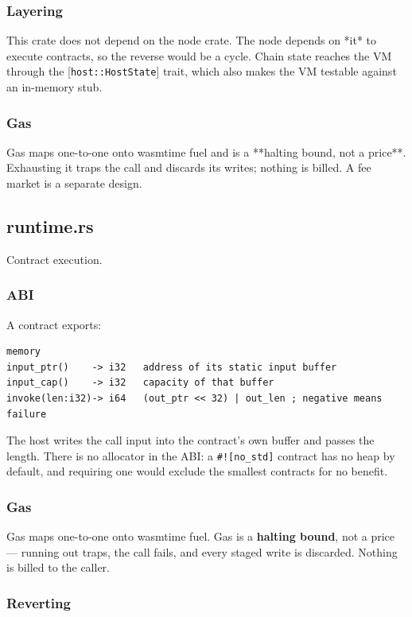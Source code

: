 \documentclass[11pt,a4paper]{article}
\begin{document}
\subsubsection{Layering}

This crate does not depend on the node crate. The node depends on *it* to
execute contracts, so the reverse would be a cycle. Chain state reaches the
VM through the [\texttt{host::HostState}] trait, which also makes the VM testable
against an in-memory stub.

\subsubsection{Gas}

Gas maps one-to-one onto wasmtime fuel and is a **halting bound, not a
price**. Exhausting it traps the call and discards its writes; nothing is
billed. A fee market is a separate design.

\subsection{runtime.rs}
Contract execution.

\subsubsection{ABI}

A contract exports:

\begin{verbatim}
memory
input_ptr()    -> i32   address of its static input buffer
input_cap()    -> i32   capacity of that buffer
invoke(len:i32)-> i64   (out_ptr << 32) | out_len ; negative means failure
\end{verbatim}

The host writes the call input into the contract's own buffer and passes the
length. There is no allocator in the ABI: a \texttt{\#![no\_std]} contract has no heap
by default, and requiring one would exclude the smallest contracts for no
benefit.

\subsubsection{Gas}

Gas maps one-to-one onto wasmtime fuel. Gas is a \textbf{halting bound}, not a
price — running out traps, the call fails, and every staged write is
discarded. Nothing is billed to the caller.

\subsubsection{Reverting}
\end{document}
